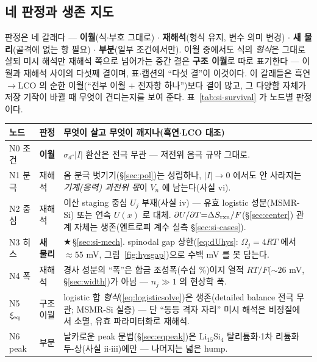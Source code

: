 \subsection{네 판정과 생존 지도}\label{ssec:si-verdicts}
판정은 네 갈래다 --- \textbf{이월}(식$\cdot$부호 그대로) $\cdot$ \textbf{재해석}(형식 유지, 변수 의미
변경) $\cdot$ \textbf{새 물리}(골격에 없는 항 필요) $\cdot$ \textbf{부분}(일부 조건에서만). 이월 중에서도
식의 \emph{형식}은 그대로 살되 미시 해석만 재해석 쪽으로 넘어가는 중간 결은 \textbf{구조 이월}로 따로
표기한다 --- 이월과 재해석 사이의 다섯째 결이며, 표$\cdot$캡션의 ``다섯 결''이 이것이다. 이 갈래들은
흑연$\to$LCO 의 순한 이월(``전부 이월 $+$ 전자항 하나'')보다 결이 많고, 그 다양함 자체가 저장 기작이
바뀔 때 무엇이 견디는지를 보여 준다. 표~\ref{tab:si-survival} 가 노드별 판정이다.

\begin{table}[h]
\centering
\small
\begin{tabular}{p{} p{} p{}}
\toprule
노드 & 판정 & 무엇이 살고 무엇이 깨지나(흑연$\cdot$LCO 대조) \\
\midrule
N0 조건 & \textbf{이월} & $\sigma_d$$\cdot$$|I|$ 환산은 전극 무관 --- 저전위 음극 규약 그대로. \\
N1 분극 & 재해석 & 옴 분극 벗기기(\S\ref{sec:pol})는 성립하나, $|I|\!\to\!0$ 에서도 안 사라지는 \emph{기계(응력) 과전위 몫}이 $V_n$ 에 남는다(사실 vi). \\
N2 중심 & 재해석 & 이산 staging 중심 $U_j$ 부재(사실 iv) --- 유효 logistic 성분(MSMR-Si\cite{verbrugge_lisi2016}) 또는 연속 $U(x)$\cite{chevrier_dahn2009} 로 대체. $\partial U/\partial T{=}\Delta S_{\mathrm{rxn}}/F$(\S\ref{sec:center}) 관계 자체는 생존(엔트로피 계수 실측 \S\ref{sec:si-cases}). \\
N3 히스 & \textbf{새 물리} & $\bigstar$\,\S\ref{sec:si-mech}. spinodal gap 상한(\eqref{eq:dUhys}: $\Omega_j{=}4RT$ 에서 $\approx55$ mV, 그림~\ref{fig:hysgap})으로 수백 mV 를 못 담는다. \\
N4 폭 & 재해석 & 경사 성분의 ``폭''은 합금 조성폭(수십 \%)이지 열적 $RT/F$($\sim26$ mV, \S\ref{sec:width})가 아님 --- $n_j\!\gg\!1$ 의 현상학 폭. \\
N5 $\xi_{\mathrm{eq}}$ & 구조 이월 & logistic 합 \emph{형식}(\eqref{eq:logisticsolve})은 생존(detailed balance 전극 무관; MSMR-Si 실증) --- 단 ``동등 격자 자리'' 미시 해석은 비정질에서 소멸, 유효 파라미터화로 재해석. \\
N6 peak & 부분 & 날카로운 peak 문법(\S\ref{sec:eqpeak})은 Li$_{15}$Si$_4$ 탈리튬화$\cdot$1차 리튬화 두-상(사실 ii$\cdot$iii)에만 --- 나머지는 넓은 hump. \\

\end{tabular}
\end{table}
